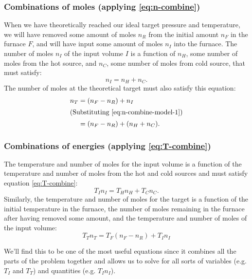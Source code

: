 \documentclass{article}
\begin{document}
\subsubsection*{Combinations of moles (applying \cref{eq:n-combine})}

When we have theoretically reached our ideal target pressure and temperature, we will have removed
some amount of moles $n_R$ from the initial amount $n_F$ in the furnace $F$, and will have input
some amount of moles $n_I$ into the furnace. The number of moles $n_I$ of the input volume $I$ is a
function of $n_H$, some number of moles from the hot source, and $n_C$, some number of moles from
cold source, that must satisfy:
\begin{equation}
    n_I = n_H + n_C. \label{eq:n-combine-model-1}
\end{equation}
The number of moles at the theoretical target must also satisfy this equation:
\begin{align}
    n_T
    &= (n_F-n_R)+n_I \label{eq:n-combine-model-2} \\
    \intertext{(Substituting \cref{eq:n-combine-model-1})}
    &= (n_F-n_R)+(n_H + n_C). \label{eq:n-combine-model-3}
\end{align}

\subsubsection*{Combinations of energies (applying \cref{eq:T-combine})}

The temperature and number of moles for the input volume is a function of the temperature and number
of moles from the hot and cold sources and must satisfy equation
\cref{eq:T-combine}:
\begin{equation}
    T_I n_I = T_H n_H + T_C n_C.
    \label{eq:T-combine-model-1}
\end{equation}
Similarly, the temperature and number of moles for the target is a function of the initial
temperature in the furnace, the number of moles remaining in the furnace after having removed some
amount, and the temperature and number of moles of the input volume:
\begin{equation}
    T_T n_T = T_F(n_F-n_R)+T_I n_I \label{eq:T-combine-model-2}
\end{equation}
\begin{itshape}
    We'll find this to be one of the most useful equations since it combines all the parts of the
    problem together and allows us to solve for all sorts of variables (e.g. $T_I$ and $T_T$) and
    quantities (e.g. $T_I n_I$).
\end{itshape}
\end{document}
